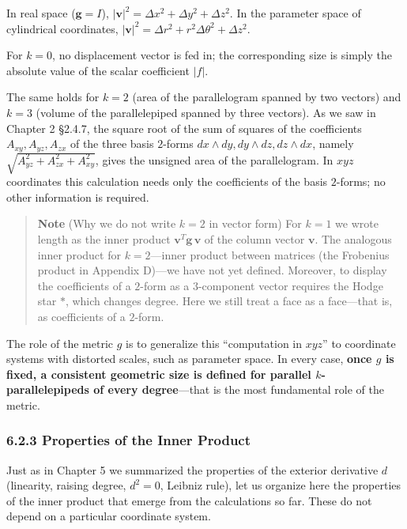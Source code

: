 \documentclass[a4paper,12pt,openany]{book}
\begin{document}
In real space (\(\mathbf{g}=I\)),
\(|\mathbf{v}|^2 = \Delta x^2 + \Delta y^2 + \Delta z^2\). In the
parameter space of cylindrical coordinates,
\(|\mathbf{v}|^2 = \Delta r^2 + r^2\Delta\theta^2 + \Delta z^2\).

For \(k=0\), no displacement vector is fed in; the corresponding size is
simply the absolute value of the scalar coefficient \(|f|\).

The same holds for \(k=2\) (area of the parallelogram spanned by two
vectors) and \(k=3\) (volume of the parallelepiped spanned by three
vectors). As we saw in Chapter 2 §2.4.7, the square root of the sum of
squares of the coefficients \(A_{xy}, A_{yz}, A_{zx}\) of the three
basis \(2\)-forms \(dx \wedge dy, dy \wedge dz, dz \wedge dx\), namely
\(\sqrt{A_{yz}^2 + A_{zx}^2 + A_{xy}^2}\), gives the unsigned area of
the parallelogram. In \(xyz\) coordinates this calculation needs only
the coefficients of the basis \(2\)-forms; no other information is
required.

\begin{quote}
\textbf{Note} (Why we do not write \(k=2\) in vector form) For \(k=1\)
we wrote length as the inner product
\(\mathbf{v}^T\mathbf{g}\,\mathbf{v}\) of the column vector
\(\mathbf{v}\). The analogous inner product for \(k=2\)—inner product
between matrices (the Frobenius product in Appendix D)—we have not yet
defined. Moreover, to display the coefficients of a \(2\)-form as a
\(3\)-component vector requires the Hodge star \(\ast\), which changes
degree. Here we still treat a face as a face—that is, as coefficients
of a \(2\)-form.
\end{quote}

The role of the metric \(g\) is to generalize this ``computation in
\(xyz\)'' to coordinate systems with distorted scales, such as parameter
space. In every case,
\textbf{once $g$ is fixed, a consistent geometric size is defined for parallel $k$-parallelepipeds of every degree}—that
is the most fundamental role of the metric.

\hypertarget{properties-of-the-inner-product}{%
\subsubsection{6.2.3 Properties of the Inner
Product}\label{properties-of-the-inner-product}}

Just as in Chapter 5 we summarized the properties of the exterior
derivative \(d\) (linearity, raising degree, \(d^2=0\), Leibniz rule),
let us organize here the properties of the inner product that emerge
from the calculations so far. These do not depend on a particular
coordinate system.
\end{document}
